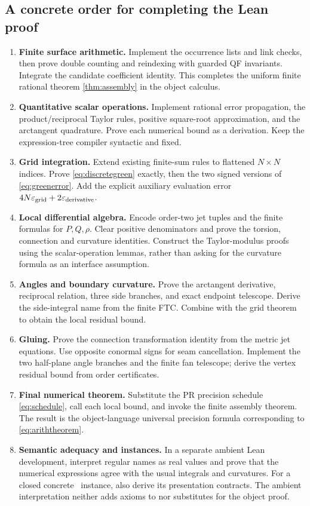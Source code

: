 \subsection{A concrete order for completing the Lean proof}

\begin{enumerate}
\item \textbf{Finite surface arithmetic.} Implement the occurrence lists and link checks, then prove double counting and reindexing with guarded QF invariants. Integrate the candidate coefficient identity. This completes the uniform finite rational theorem \cref{thm:assembly} in the object calculus.
\item \textbf{Quantitative scalar operations.} Implement rational error propagation, the product/reciprocal Taylor rules, positive square-root approximation, and the arctangent quadrature. Prove each numerical bound as a  derivation. Keep the expression-tree compiler syntactic and fixed.
\item \textbf{Grid integration.} Extend existing finite-sum rules to flattened $N\times N$ indices. Prove \eqref{eq:discretegreen} exactly, then the two signed versions of \eqref{eq:greenerror}. Add the explicit auxiliary evaluation error $4N\varepsilon_{\rm grid}+2\varepsilon_{\rm derivative}$.
\item \textbf{Local differential algebra.} Encode order-two jet tuples and the finite formulas for $P,Q,\rho$. Clear positive denominators and prove the torsion, connection and curvature identities. Construct the Taylor-modulus proofs using the scalar-operation lemmas, rather than asking for the curvature formula as an interface assumption.
\item \textbf{Angles and boundary curvature.} Prove the arctangent derivative, reciprocal relation, three side branches, and exact endpoint telescope. Derive the side-integral name from the finite FTC. Combine with the grid theorem to obtain the local residual bound.
\item \textbf{Gluing.} Prove the connection transformation identity from the metric jet equations. Use opposite conormal signs for seam cancellation. Implement the two half-plane angle branches and the finite fan telescope; derive the vertex residual bound from order certificates.
\item \textbf{Final numerical theorem.} Substitute the PR precision schedule \eqref{eq:schedule}, call each local bound, and invoke the finite assembly theorem. The result is the object-language universal precision formula corresponding to \eqref{eq:ariththeorem}.
\item \textbf{Semantic adequacy and instances.} In a separate ambient Lean development, interpret regular names as real values and prove that the numerical expressions agree with the usual integrals and curvatures. For a closed concrete \ipra\ instance, also derive its presentation contracts. The ambient interpretation neither adds axioms to nor substitutes for the object proof.
\end{enumerate}

